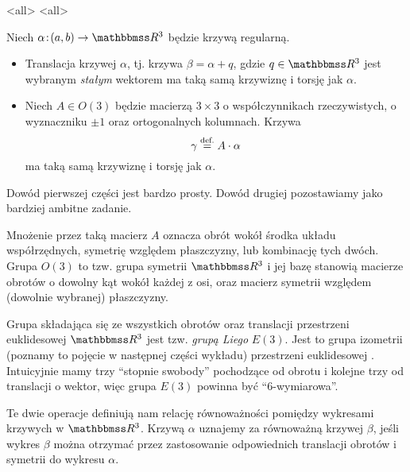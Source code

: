 \mode*
\mode<all>{}
\mode<all>{}
\begin{frame}[<+->]
\begin{lemat}
Niech $\alpha\colon (a,b)\to \R^3$ będzie krzywą regularną. 
\begin{itemize}
\item Translacja krzywej $\alpha$, tj. krzywa $\beta=\alpha+q$, gdzie $q\in \R^3$ jest wybranym \textit{stałym} wektorem ma taką samą krzywiznę i torsję jak $\alpha$.
\item Niech $A\in O(3)$ będzie macierzą $3\times 3$ o współczynnikach rzeczywistych, o wyznaczniku $\pm1$ oraz ortogonalnych kolumnach. Krzywa \[\gamma\define A\cdot\alpha\] ma taką samą krzywiznę i torsję jak $\alpha$.
\end{itemize}
\end{lemat}

\begin{uwaga}
Dowód pierwszej części jest bardzo prosty. Dowód drugiej pozostawiamy jako bardziej ambitne zadanie.
\end{uwaga}

\end{frame}
\begin{frame}[<+->]

\begin{uwaga}
Mnożenie przez taką macierz $A$ oznacza obrót wokół środka układu współrzędnych, symetrię względem płaszczyzny, lub kombinację tych dwóch. Grupa $O(3)$ to tzw. grupa symetrii $\R^3$ i jej bazę stanowią macierze obrotów o dowolny kąt wokół każdej z osi, oraz macierz symetrii względem (dowolnie wybranej) płaszczyzny.
\end{uwaga}

\begin{uwaga}
Grupa składająca się ze wszystkich obrotów oraz translacji przestrzeni euklidesowej $\R^3$ jest tzw. \textit{grupą Liego} $E(3)$. Jest to grupa izometrii (poznamy to pojęcie w następnej części wykładu) przestrzeni euklidesowej . Intuicyjnie mamy trzy ``stopnie swobody'' pochodzące od obrotu i kolejne trzy od translacji o wektor, więc grupa $E(3)$ powinna być ``$6$-wymiarowa''. 
\end{uwaga}

\end{frame}
\begin{frame}[<+->]

\begin{uwaga}
Te dwie operacje definiują nam relację równoważności pomiędzy wykresami krzywych w $\R^3$. Krzywą $\alpha$ uznajemy za równoważną krzywej $\beta$, jeśli wykres $\beta$ można otrzymać przez zastosowanie odpowiednich translacji obrotów i symetrii do wykresu $\alpha$.
\end{uwaga}

\end{frame}
